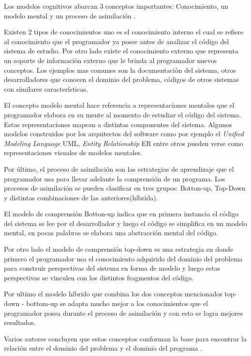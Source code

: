 \documentclass[a4paper,12pt]{report}
\begin{document}
Los modelos cognitivos abarcan 3 conceptos importantes: Conocimiento, un modelo mental y un proceso de asimilación \cite{MAS05}.

Existen 2 tipos de conocimientos uno es el conocimiento interno el cual se refiere al conocimiento que el programador ya posee antes de analizar el código del sistema de estudio. Por otro lado existe el conocimiento externo que representa un soporte de información externo que le brinda al programador nuevos conceptos. Los ejemplos mas comunes son la documentación del sistema, otros desarrolladores que conocen el dominio del problema, códigos de otros sistemas con similares características.

El concepto modelo mental hace referencia a representaciones mentales que el programador elabora en su mente al momento de estudiar el código del sistema. Estas representaciones mapean a distintas componentes del sistema. Algunos modelos construidos por los arquitectos del software como por ejemplo el \textit{Unified Modeling Language} UML, \textit{Entity Relationship} ER entre otros pueden verse como representaciones visuales de modelos mentales. 

Por último, el proceso de asimilación son las estrategias de aprendizaje que el programador usa para llevar adelante la comprensión de un programa. Los procesos de asimilación se pueden clasificar en tres grupos: Botton-up, Top-Down y distintas combinaciones de las anteriores(híbrida)\cite{MPOB03}.

El modelo de comprensión Botton-up indica que en primera instancia el código del sistema se lee por el desarrollador y luego el código se simplifica en un modelo mental, en pocas palabras se elabora una abstracción mental del código.

Por otro lado el modelo de comprensión top-down es una estrategia en donde primero el programador usa el conocimiento adquirido del dominio del problema para construir perspectivas del sistema en forma de modelo y luego estas perspectivas se vinculen con los distintos fragmentos del código.

Por ultimo el modelo híbrido que combina los dos conceptos mencionados top-down - bottom-up se adapta mucho mejor a los conocimientos que el programador posea durante el proceso de asimilación y con esto se logra mejores resultados.

Varios autores concluyen que estos conceptos conforman la base para encontrar la relación entre el dominio del problema y el dominio del programa \cite{TIE89,MPOB03}.
\end{document}
